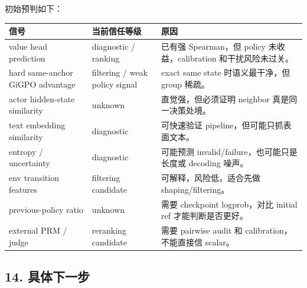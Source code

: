 \documentclass[
  10pt,
]{ctexart}
\newcounter{none} %
\begin{document}
初始预判如下：

{\def\LTcaptype{none} %
\begin{longtable}[]{@{}
  >{\raggedright\arraybackslash}p{}
  >{\raggedright\arraybackslash}p{}
  >{\raggedright\arraybackslash}p{}@{}}
\toprule\noalign{}
\begin{minipage}[b]{\linewidth}\raggedright
信号
\end{minipage} & \begin{minipage}[b]{\linewidth}\raggedright
当前信任等级
\end{minipage} & \begin{minipage}[b]{\linewidth}\raggedright
原因
\end{minipage} \\
\midrule\noalign{}
\endhead
\bottomrule\noalign{}
\endlastfoot
value head prediction & diagnostic / ranking & 已有强 Spearman，但
policy 未收益，calibration 和干扰风险未过关。 \\
hard same-anchor GiGPO advantage & filtering / weak policy signal &
exact same state 时语义最干净，但 group 稀疏。 \\
actor hidden-state similarity & unknown & 直觉强，但必须证明 neighbor
真是同一决策处境。 \\
text embedding similarity & diagnostic & 可快速验证
pipeline，但可能只抓表面文本。 \\
entropy / uncertainty & diagnostic & 可能预测
invalid/failure，也可能只是长度或 decoding 噪声。 \\
env transition features & filtering candidate & 可解释，风险低，适合先做
shaping/filtering。 \\
previous-policy ratio & unknown & 需要 checkpoint logprob，对比 initial
ref 才能判断是否更好。 \\
external PRM / judge & reranking candidate & 需要 pairwise audit 和
calibration，不能直接信 scalar。 \\
\end{longtable}
}

\subsection{14. 具体下一步}\label{ux5177ux4f53ux4e0bux4e00ux6b65}
\end{document}

